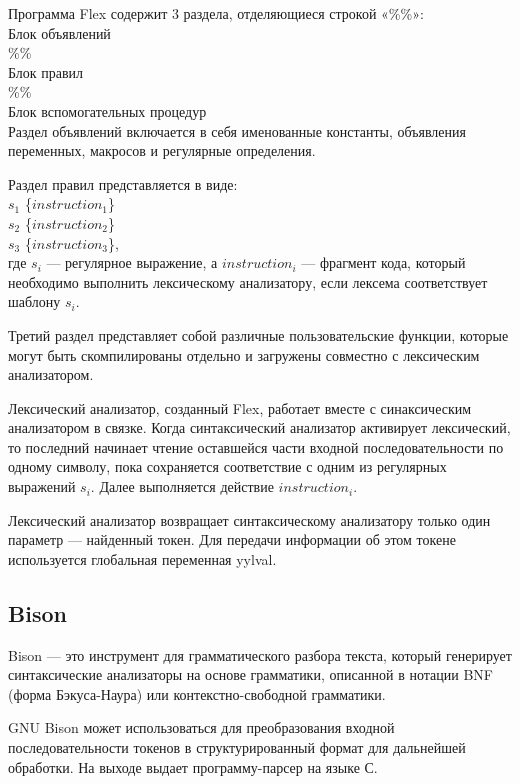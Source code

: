 \documentclass[bachelor, och, coursework, times]{SCWorks}
\begin{document}
Программа Flex содержит 3 раздела, отделяющиеся строкой «\%\%»: \\
Блок объявлений \\
\%\% \\
Блок правил \\
\%\% \\
Блок вспомогательных процедур \\

Раздел объявлений включается в себя именованные константы, объявления переменных, макросов и регулярные определения.

Раздел правил представляется в виде: \\
$s_1$ \{$instruction_1$\} \\
$s_2$ \{$instruction_2$\} \\
$s_3$ \{$instruction_3$\}, \\

где $s_i$ --- регулярное выражение, а $instruction_i$ --- фрагмент кода, который необходимо выполнить лексическому анализатору, если лексема соответствует шаблону $s_i$.

Третий раздел представляет собой различные пользовательские функции, которые могут быть скомпилированы отдельно и загружены совместно с лексическим анализатором.

Лексический анализатор, созданный Flex, работает вместе с синаксическим анализатором в связке. Когда синтаксический анализатор активирует лексический, то последний начинает чтение оставшейся части входной последовательности по одному символу, пока сохраняется соответствие с одним из регулярных выражений $s_i$. Далее выполняется действие $instruction_i$.

Лексический анализатор возвращает синтаксическому анализатору только один параметр --- найденный токен. Для передачи информации об этом токене используется глобальная переменная yylval.~\cite{Hunter}

\subsection{Bison}

Bison --- это инструмент для грамматического разбора текста, который генерирует синтаксические анализаторы на основе грамматики, описанной в нотации BNF (форма Бэкуса-Наура) или контекстно-свободной грамматики.

GNU Bison может использоваться для преобразования входной последовательности токенов в структурированный формат для дальнейшей обработки. На выходе выдает программу-парсер на языке С.
\end{document}
